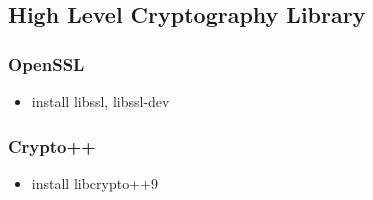 \subsection{High Level Cryptography Library}

\subsubsection{OpenSSL}

\begin{itemize}
 \item install libssl, libssl-dev
\end{itemize}

\subsubsection{Crypto++}
\begin{itemize}
 \item install  libcrypto++9
\end{itemize}

